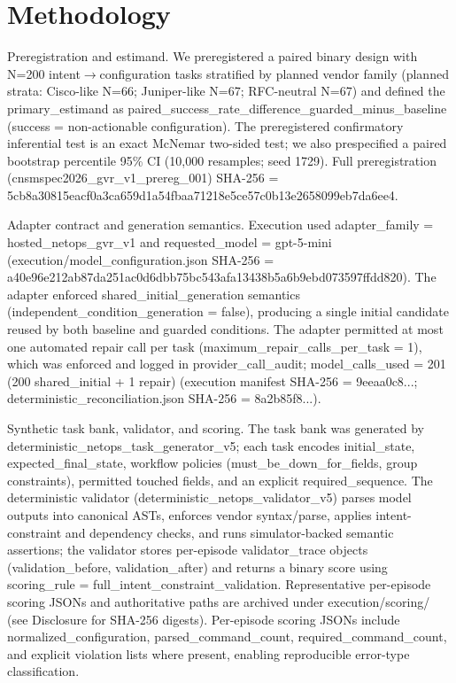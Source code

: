 \documentclass[conference]{IEEEtran}
\begin{document}
\section{Methodology}
Preregistration and estimand. We preregistered a paired binary design with N=200 intent\ensuremath{\rightarrow}configuration tasks stratified by planned vendor family (planned strata: Cisco-like N=66; Juniper-like N=67; RFC-neutral N=67) and defined the primary\_estimand as paired\_success\_rate\_difference\_guarded\_minus\_baseline (success = non-actionable configuration). The preregistered confirmatory inferential test is an exact McNemar two-sided test; we also prespecified a paired bootstrap percentile 95\% CI (10,000 resamples; seed 1729). Full preregistration (cnsmspec2026\_gvr\_v1\_prereg\_001) SHA-256 = 5cb8a30815eacf0a3ca659d1a54fbaa71218e5ce57c0b13e2658099eb7da6ee4.

Adapter contract and generation semantics. Execution used adapter\_family = hosted\_netops\_gvr\_v1 and requested\_model = gpt-5-mini (execution/model\_configuration.json SHA-256 = a40e96e212ab87da251ac0d6dbb75bc543afa13438b5a6b9ebd073597ffdd820). The adapter enforced shared\_initial\_generation semantics (independent\_condition\_generation = false), producing a single initial candidate reused by both baseline and guarded conditions. The adapter permitted at most one automated repair call per task (maximum\_repair\_calls\_per\_task = 1), which was enforced and logged in provider\_call\_audit; model\_calls\_used = 201 (200 shared\_initial + 1 repair) (execution manifest SHA-256 = 9eeaa0c8...; deterministic\_reconciliation.json SHA-256 = 8a2b85f8...).

Synthetic task bank, validator, and scoring. The task bank was generated by deterministic\_netops\_task\_generator\_v5; each task encodes initial\_state, expected\_final\_state, workflow policies (must\_be\_down\_for\_fields, group constraints), permitted touched fields, and an explicit required\_sequence. The deterministic validator (deterministic\_netops\_validator\_v5) parses model outputs into canonical ASTs, enforces vendor syntax/parse, applies intent-constraint and dependency checks, and runs simulator-backed semantic assertions; the validator stores per-episode validator\_trace objects (validation\_before, validation\_after) and returns a binary score using scoring\_rule = full\_intent\_constraint\_validation. Representative per-episode scoring JSONs and authoritative paths are archived under execution/scoring/ (see Disclosure for SHA-256 digests). Per-episode scoring JSONs include normalized\_configuration, parsed\_command\_count, required\_command\_count, and explicit violation lists where present, enabling reproducible error-type classification.
\end{document}
